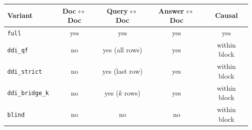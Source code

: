 \begin{tabular}{lcccc}
\toprule
Variant & Doc$\leftrightarrow$Doc & Query$\leftrightarrow$Doc & Answer$\leftrightarrow$Doc & Causal \\
\midrule
\texttt{full} & yes & yes & yes & yes \\
\texttt{ddi\_qf} & no & yes (all rows) & yes & within block \\
\texttt{ddi\_strict} & no & yes (last row) & yes & within block \\
\texttt{ddi\_bridge\_k} & no & yes ($k$ rows) & yes & within block \\
\texttt{blind} & no & no & no & within block \\
\bottomrule
\end{tabular}
